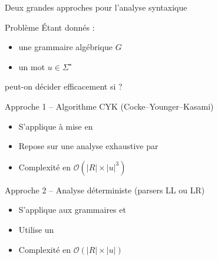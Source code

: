 
\begingroup

\begin{frame}{Deux grandes approches pour l'analyse syntaxique}

  \begin{alertblock}{Problème}
    Étant donnés :
    \begin{itemize}
      \item une grammaire algébrique $G$
      \item un mot $u \in \Sigma^\star$
    \end{itemize}
    peut-on décider efficacement si  ?
  \end{alertblock}

  \begin{block}{Approche 1 -- Algorithme CYK (Cocke–Younger–Kasami)}
    \begin{itemize}
      \item S'applique à  mise en %
      \item Repose sur une analyse exhaustive par 
      \item Complexité en $\mathcal{O}(|R| \times |u|^3)$
    \end{itemize}
  \end{block}

  \begin{block}{Approche 2 -- Analyse déterministe (parsers LL ou LR)}
    \begin{itemize}
      \item S'applique aux grammaires  et 
      \item Utilise un 
      \item Complexité en $\mathcal{O}(|R| \times |u|)$
    \end{itemize}
  \end{block}

\end{frame}

\endgroup
\endinput

